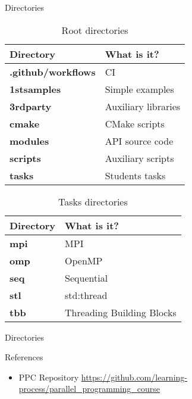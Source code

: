 \documentclass{beamer}
\begin{document}
\begin{frame}[fragile]{Directories}
  \begin{table}[h!]
    \resizebox{8cm}{!} {
      \begin{tabular}{| p{4.2 cm} | p{4.2 cm} |}
      \hline
      \textbf{Directory} & \textbf{What is it?} \\
      \hline
      \textbf{.github/workflows} & CI \\
      \hline
      \textbf{1stsamples} & Simple examples \\
      \hline
      \textbf{3rdparty} & Auxiliary libraries \\
      \hline
      \textbf{cmake} & CMake scripts \\
      \hline
      \textbf{modules} & API source code \\
      \hline
      \textbf{scripts} & Auxiliary scripts \\
      \hline
      \textbf{tasks} & Students tasks \\
      \hline
    \end{tabular}
    }
    \caption{Root directories}
  \end{table}

  \begin{table}[h!]
    \resizebox{8cm}{!} {
    \begin{tabular}{| p{4.2 cm} | p{4.2 cm} |}
      \hline
      \textbf{Directory} & \textbf{What is it?} \\
      \hline
      \textbf{mpi} & MPI \\
      \hline
      \textbf{omp} & OpenMP \\
      \hline
      \textbf{seq} & Sequential \\
      \hline
      \textbf{stl} & std:thread \\
      \hline
      \textbf{tbb} & Threading Building Blocks \\
      \hline
    \end{tabular}
    }
    \caption{Tasks directories}
  \end{table}

\end{frame}

\begin{frame}[fragile]{Directories}
\end{frame}

\begin{frame}{References}
  \begin{itemize}
    \item PPC Repository \href{https://github.com/learning-process/parallel\_programming\_course}{https://github.com/learning-process/parallel\_programming\_course}
  \end{itemize}
\end{frame}
\end{document}

